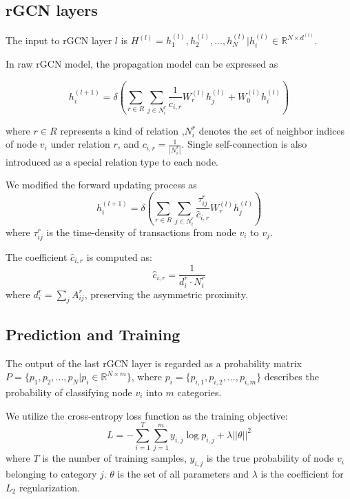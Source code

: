 \subsection{rGCN layers}
\label{sec:rGCN layers}
The input to rGCN layer $l$ is $H^{(l)}={h_1^{(l)},h_2^{(l)},...,h_N^{(l)}|h_i^{(l)}\in \mathbb{R}^{N \times d^{(l)}}}$.

In raw rGCN model, the propagation model can be expressed as

\begin{equation}
h_i^{(l+1)}=\delta(\sum_{r\in R} \sum_{j \in N_i^r} \frac{1}{c_{i,r}}W_r^{(l)}h_j^{(l)}+W_0^{(l)}h_i^{(l)})
\label{eq:rgcn}
\end{equation}

where $r \in R$ represents a kind of relation ,$N_i^r$ denotes the set of neighbor indices of node $v_i$ under relation $r$, and $c_{i,r}=\frac{1}{|N_i^r|}$. Single self-connection is also introduced as a special relation type to each node. %

We modified the forward updating process as 
\begin{equation}
h_i^{(l+1)}=\delta(\sum_{r\in R} \sum_{j \in N_i^r} \frac{\tau_{ij}^r}{\hat c_{i,r}}W_r^{(l)}h_j^{(l)})
\end{equation}
where $\tau_{ij}^r$ is the time-density of transactions from node $v_i$ to $v_j$. 

The coefficient $\hat c_{i,r}$ is computed as:
\begin{equation}
\hat c_{i,r}=\frac{1}{d_i^r\cdot N_i^r}
\end{equation}
where $d_i^r=\sum_{j}A^r_{ij}$, preserving the asymmetric proximity.


\subsection{Prediction and Training}
The output of the last rGCN layer is regarded as a probability matrix $P=\{p_1,p_2,...,p_N|p_i\in \mathbb{R}^{N \times m}\}$, where $p_i=\{p_{i,1},p_{i,2},...,p_{i,m}\}$ describes the probability of classifying node $v_i$ into $m$ categories. 

We utilize the cross-entropy loss function as the training objective:
\begin{equation}
L=-\sum_{i=1}^T\sum_{j=1}^m y_{i,j}\log p_{i,j}+\lambda ||\theta||^2
\end{equation}
where $T$ is the number of training samples, $y_{i,j}$ is the true probability of node $v_i$ belonging to category $j$. $\theta$ is the set of all parameters and $\lambda$ is the coefficient for $L_2$  regularization.
